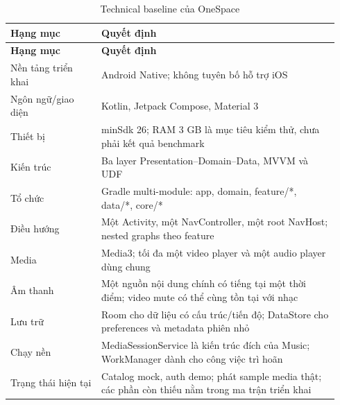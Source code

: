 \begingroup
\small
\renewcommand{\arraystretch}{1.2}
\setlength{\tabcolsep}{3pt}
\begin{longtable}{>{\RaggedRight\arraybackslash}p{0.26\linewidth}>{\RaggedRight\arraybackslash}p{0.68\linewidth}}
\caption{Technical baseline của OneSpace}
\label{tab:baseline}\\
\toprule
\textbf{Hạng mục} & \textbf{Quyết định} \\
\midrule
\endfirsthead
\toprule
\textbf{Hạng mục} & \textbf{Quyết định} \\
\midrule
\endhead
\bottomrule
\endfoot
Nền tảng triển khai & Android Native; không tuyên bố hỗ trợ iOS \\
Ngôn ngữ/giao diện & Kotlin, Jetpack Compose, Material 3 \\
Thiết bị & minSdk 26; RAM 3 GB là mục tiêu kiểm thử, chưa phải kết quả benchmark \\
Kiến trúc & Ba layer Presentation--Domain--Data, MVVM và UDF \\
Tổ chức & Gradle multi-module: app, domain, feature/*, data/*, core/* \\
Điều hướng & Một Activity, một NavController, một root NavHost; nested graphs theo feature \\
Media & Media3; tối đa một video player và một audio player dùng chung \\
Âm thanh & Một nguồn nội dung chính có tiếng tại một thời điểm; video mute có thể cùng tồn tại với nhạc \\
Lưu trữ & Room cho dữ liệu có cấu trúc/tiến độ; DataStore cho preferences và metadata phiên nhỏ \\
Chạy nền & MediaSessionService là kiến trúc đích của Music; WorkManager dành cho công việc trì hoãn \\
Trạng thái hiện tại & Catalog mock, auth demo; phát sample media thật; các phần còn thiếu nằm trong ma trận triển khai \\
\end{longtable}
\endgroup











\endgroup

